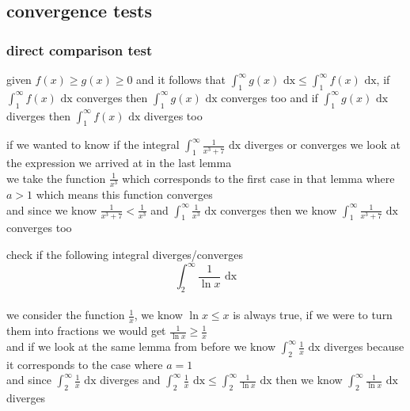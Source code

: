 \documentclass[a4paper,12pt]{article}
\newcommand{\?}{\stackrel{?}{=}}
\begin{document}
\subsection{convergence tests}
\label{sec:orgf6a3860}
\subsubsection{direct comparison test}
\label{sec:orgbfc2763}
\begin{definition}
given \(f(x) \geq g(x) \geq 0\) and it follows that \(\int_1^\infty g(x) \text{ dx} \leq \int_1^\infty f(x) \text{ dx}\), if \(\int_1^\infty f(x) \text{ dx}\) converges then \(\int_1^\infty g(x) \text{ dx}\) converges too and if \(\int_1^\infty g(x) \text{ dx}\) diverges then \(\int_1^\infty f(x) \text{ dx}\) diverges too\\[0pt]

\begin{my_example}
if we wanted to know if the integral \(\int_1^\infty \frac{1}{x^3+7} \text{ dx}\) diverges or converges we look at the expression we arrived at in the last lemma\\[0pt]
we take the function \(\frac{1}{x^3}\) which corresponds to the first case in that lemma where \(a > 1\) which means this function converges\\[0pt]
and since we know \(\frac{1}{x^3+7} < \frac{1}{x^3}\) and \(\int_1^\infty \frac{1}{x^3} \text{ dx}\) converges then we know \(\int_1^\infty \frac{1}{x^3+7} \text{ dx}\) converges too\\[0pt]
\end{my_example}

\begin{my_example}
check if the following integral diverges/converges\\[0pt]
\[
  \int_2^\infty \frac{1}{\ln{x}} \text{ dx}
\]\\[0pt]
we consider the function \(\frac1x\), we know \(\ln{x} \leq x\) is always true, if we were to turn them into fractions we would get \(\frac{1}{\ln{x}} \geq \frac{1}{x}\)\\[0pt]
and if we look at the same lemma from before we know \(\int_2^\infty \frac{1}{x} \text{ dx}\) diverges because it corresponds to the case where \(a=1\)\\[0pt]
and since \(\int_2^\infty \frac{1}{x} \text{ dx}\) diverges and \(\int_2^\infty \frac{1}{x} \text{ dx} \leq \int_2^\infty \frac{1}{\ln{x}} \text{ dx}\) then we know \(\int_2^\infty \frac{1}{\ln{x}} \text{ dx}\) diverges\\[0pt]
\end{my_example}


\end{definition}
\end{document}
